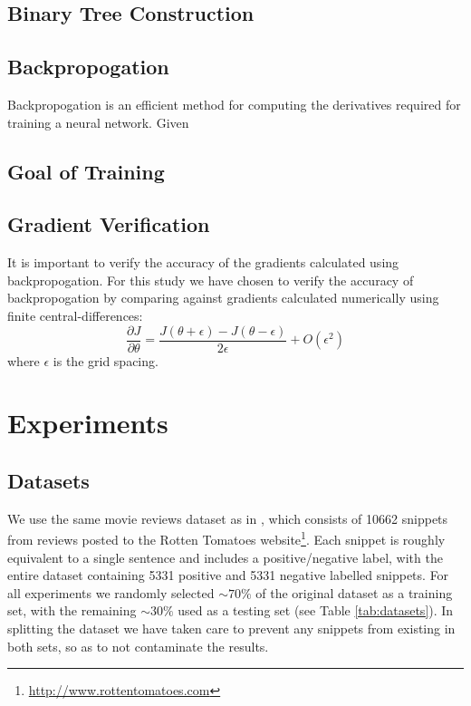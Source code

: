 \documentclass{article}
\begin{document}
\subsection{Binary Tree Construction}


\subsection{Backpropogation}
Backpropogation is an efficient method for computing the derivatives required for training a neural network. Given



\subsection{Goal of Training}


\subsection{Gradient Verification}
It is important to verify the accuracy of the gradients calculated using backpropogation. For this study we have chosen to verify the accuracy of backpropogation by comparing against gradients calculated numerically using finite central-differences:
\begin{equation}
    \frac{\partial J}{\partial \theta} = \frac{J(\theta + \epsilon) - J(\theta - \epsilon)}{2\epsilon} + O(\epsilon ^2)
\end{equation}
where $\epsilon$ is the grid spacing.



\section{Experiments}

%
%
\subsection{Datasets}
We use the same movie reviews dataset as in \cite{Socher}, which consists of 10662 snippets from reviews posted to the Rotten Tomatoes website\footnote{\url{http://www.rottentomatoes.com}}. Each snippet is roughly equivalent to a single sentence and includes a positive/negative label, with the entire dataset containing 5331 positive and 5331 negative labelled snippets. For all experiments we randomly selected $\sim 70\%$ of the original dataset as a training set, with the remaining $\sim 30\%$ used as a testing set (see Table \ref{tab:datasets}). In splitting the dataset we have taken care to prevent any snippets from existing in both sets, so as to not contaminate the results.
\end{document}
